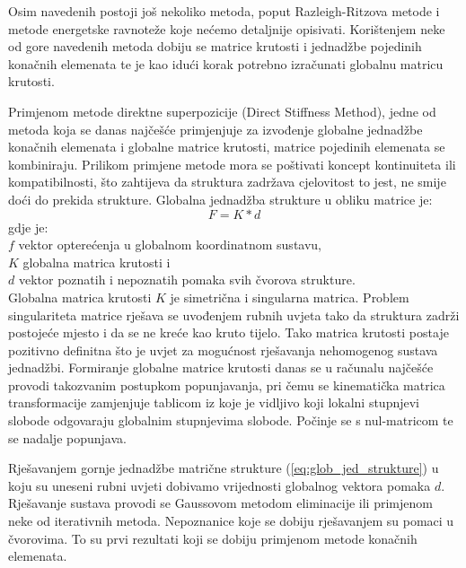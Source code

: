 \documentclass[a4paper,twoside,12pt]{memoir} %
\begin{document}
Osim navedenih postoji još nekoliko metoda, poput Razleigh-Ritzova metode i metode energetske ravnoteže koje nećemo detaljnije opisivati. Korištenjem neke od gore navedenih metoda dobiju se matrice krutosti i jednadžbe pojedinih konačnih elemenata te je kao idući korak potrebno izračunati globalnu matricu krutosti. \par

Primjenom metode direktne superpozicije (Direct Stiffness Method), jedne od metoda koja se danas najčešće primjenjuje za izvođenje globalne jednadžbe konačnih elemenata i globalne matrice krutosti, matrice pojedinih elemenata se kombiniraju. Prilikom primjene metode mora se poštivati koncept kontinuiteta ili kompatibilnosti, što zahtijeva da struktura zadržava cjelovitost to jest, ne smije doći do prekida strukture. Globalna jednadžba strukture u obliku matrice je:
\begin{equation}
\label{eq:glob_jed_strukture}
	F = K * d
\end{equation}
gdje je: \\
$f$ vektor opterećenja u globalnom koordinatnom sustavu, \\
$K$ globalna matrica krutosti i \\
$d$ vektor poznatih i nepoznatih pomaka svih čvorova strukture. \\

Globalna matrica krutosti $K$ je simetrična i singularna matrica. Problem singulariteta matrice rješava se uvođenjem rubnih uvjeta tako da struktura zadrži postojeće mjesto i da se ne kreće kao kruto tijelo. Tako matrica krutosti postaje pozitivno definitna što je uvjet za mogućnost rješavanja nehomogenog sustava jednadžbi.
Formiranje globalne matrice krutosti danas se u računalu najčešće provodi takozvanim postupkom popunjavanja, pri čemu se kinematička matrica transformacije zamjenjuje tablicom iz koje je vidljivo koji lokalni stupnjevi slobode odgovaraju globalnim stupnjevima slobode. Počinje se s nul-matricom te se nadalje popunjava. \par

Rješavanjem gornje jednadžbe matrične strukture (\ref{eq:glob_jed_strukture}) u koju su uneseni rubni uvjeti dobivamo vrijednosti globalnog vektora pomaka $d$. Rješavanje sustava provodi se Gaussovom metodom eliminacije ili primjenom neke od iterativnih metoda. Nepoznanice koje se dobiju rješavanjem su pomaci u čvorovima. To su prvi rezultati koji se dobiju primjenom metode konačnih elemenata. \par
\end{document}
